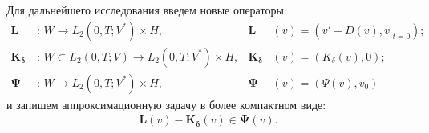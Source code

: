 \documentclass[14pt, a4paper]{extarticle}
\numberwithin{equation}{section}
\begin{document}
    Для дальнейшего исследования введем новые операторы:
    \begin{align*}
        \boldsymbol{L}&\, : \,W \rightarrow L_2(0,T;V^*) \times H,&\boldsymbol{L}&(v) = (v' + D(v), v|_{t=0}); \\
        \boldsymbol{K_\delta}&\, : \,W \subset L_2(0,T;V) \rightarrow L_2(0,T;V^*) \times H,&\boldsymbol{K_\delta}&(v) = (K_\delta(v), 0); \\
        \boldsymbol{\Psi}&\, : \,W \rightarrow L_2(0,T;V^*) \times H,&\boldsymbol{\Psi}&(v) = (\Psi(v), v_0)
    \end{align*}
    \noindent и запишем аппроксимационную задачу в более компактном виде:
    \begin{equation}\label{eq:4.4}
        \begin{gathered}
            \boldsymbol{L}(v) - \boldsymbol{K_\delta}(v) \in \boldsymbol{\Psi}(v).
        \end{gathered}
    \end{equation}
\end{document}
